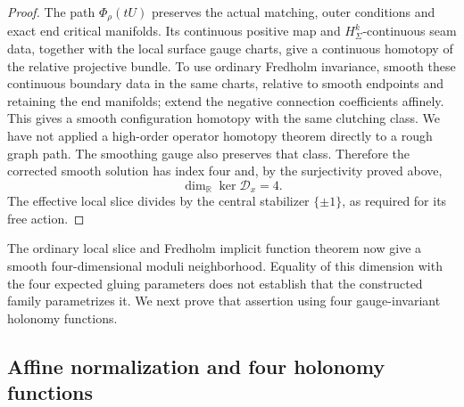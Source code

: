 \documentclass[11pt]{amsart}
\theoremstyle{definition}
\theoremstyle{remark}
\theoremstyle{plain}
\begin{document}
\begin{proof}
The path $\Phi_\rho(tU)$ preserves the actual matching,
outer conditions and exact end critical manifolds. Its continuous
positive map and $H^k_\Sigma$-continuous seam data, together
with the local surface gauge charts, give a continuous homotopy of
the relative projective bundle. To use ordinary Fredholm invariance,
smooth these continuous boundary data in the same charts, relative
to smooth endpoints and retaining the end manifolds; extend the
negative connection coefficients affinely. This gives a smooth
configuration homotopy with the same clutching class. We have not
applied a high-order operator homotopy theorem directly to a rough
graph path. The smoothing gauge also preserves that class. Therefore
the corrected smooth solution has index four and, by the surjectivity
proved above,
\begin{equation}\label{eq:gluing-standard-kernel-dimension}
                         \dim_\mathbb R\ker\mathscr D_x=4.
\end{equation}
The effective local slice divides by the central stabilizer
$\{\pm1\}$, as required for its free action.
\end{proof}

The ordinary local slice and Fredholm implicit function theorem
\cite[Propositions~3.18 and 4.6]{DaeFukLip21a} now give a
smooth four-dimensional moduli neighborhood. Equality of this dimension
with the four expected gluing parameters does not establish that the
constructed family parametrizes it. We next prove that assertion using
four gauge-invariant holonomy functions.

\subsection{Affine normalization and four holonomy functions}
\end{document}
